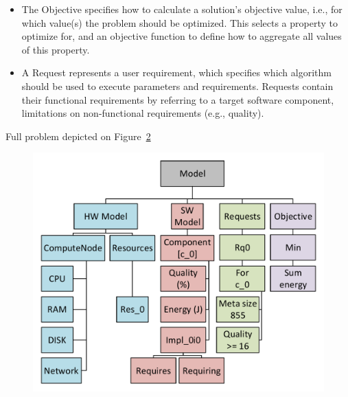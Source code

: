 \begin{itemize}
\begin{figure}
		\caption{}
		\label{fig:SWModel}
	\end{figure}
	\item The Objective specifies how to calculate a solution's objective value, i.e., for which value(s) the problem should be optimized. This selects a property to optimize for, and an objective function to define how to aggregate all values of this property.
	\item A Request represents a user requirement, which specifies which algorithm should be used to execute parameters and requirements. Requests contain their functional requirements by referring to a target software component, limitations on non-functional requirements (e.g., quality).
\end{itemize}
Full problem depicted on Figure~\ref{fig:mquatmodel}
\begin{figure}
	\centering
	\includegraphics[width=\textwidth]{images/MQuATModel}
	\caption{}
	\label{fig:mquatmodel}
\end{figure}

